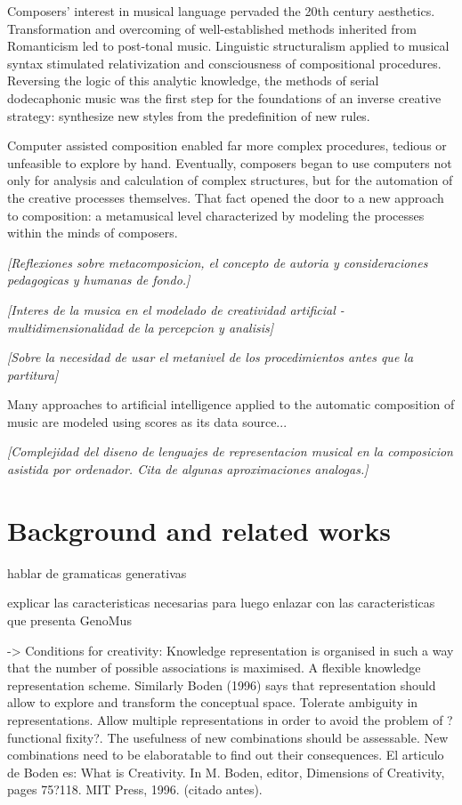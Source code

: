 \documentclass{article}
\begin{document}
Composers' interest in musical language pervaded the 20th
century aesthetics. Transformation and overcoming of well-established methods
inherited from Romanticism led to post-tonal
music. Linguistic structuralism applied to musical
syntax stimulated relativization and consciousness of
compositional procedures. Reversing the logic of this analytic knowledge, the methods
of serial dodecaphonic music was the first step for the foundations of
an inverse creative strategy: synthesize new styles from the predefinition of new rules. 

Computer assisted composition enabled
far more complex procedures, tedious or unfeasible to explore by hand. Eventually, composers began to use computers not only for analysis and calculation of complex structures, but for the automation of the creative processes themselves. That fact opened the door to a new approach to composition: a metamusical level characterized by modeling the processes within the minds of composers. 

{\color{gray} \textsl{[Reflexiones sobre metacomposicion, el concepto de autoria y consideraciones pedagogicas y humanas de fondo.]}}


{\color{gray} \textsl{[Interes de la musica en el modelado de creatividad artificial - multidimensionalidad de la percepcion y analisis]}}

{\color{gray} \textsl{[Sobre la necesidad de usar el metanivel de los procedimientos antes que la partitura]}}

Many approaches to artificial intelligence applied to the automatic composition of music are modeled using scores as its data source...

{\color{gray} \textsl{[Complejidad del diseno de lenguajes de representacion musical en la composicion asistida por ordenador. Cita de algunas aproximaciones analogas.]}}


\section{Background and related works}

hablar de gramaticas generativas

explicar las caracteristicas necesarias para luego enlazar con las caracteristicas que presenta GenoMus

\cite{DBLP:journals/air/RoweP93} -> Conditions for creativity:
Knowledge representation is organised in such a
way that the number of possible associations is
maximised. A flexible knowledge representation
scheme. Similarly Boden (1996) says that representation
should allow to explore and transform the
conceptual space.
Tolerate ambiguity in representations.
Allow multiple representations in order to avoid the
problem of ?functional fixity?.
The usefulness of new combinations should be assessable.
New combinations need to be elaboratable to find
out their consequences.
El articulo de Boden es: 
What is Creativity. In M. Boden, editor, Dimensions of Creativity, pages 75?118. MIT Press, 1996. (citado antes).
\end{document}
